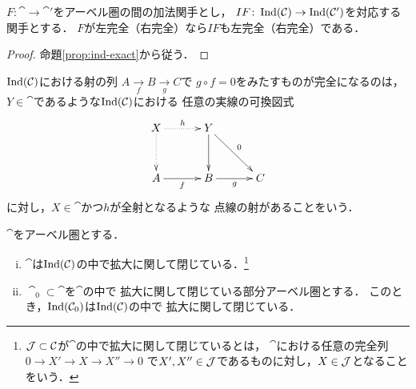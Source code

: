 \begin{comment}
\begin{Lemma}
    $I$を小さいフィルター圏，
    $\alpha\colon T\to \cat$を関手，
    $A=\limf\alpha$とし，
    $f\colon A\hookrightarrow B$を$\Ind(\cat)$における単射とする．
    このとき，小さいフィルター圏$K$と共終関手$p$
\end{Lemma}
\end{comment}

\begin{Corollary}
    $F\colon \cat\to\cat'$をアーベル圏の間の加法関手とし，
    $IF\colon\mathop{\mathrm{Ind}}(\mathcal{C})\to\mathop{\mathrm{Ind}}(\mathcal{C}')$を対応する関手とする．
    $F$が左完全（右完全）なら$IF$も左完全（右完全）である．
\end{Corollary}

\begin{proof}
    命題\ref{prop:ind-exact}から従う．
\end{proof}

\begin{Proposition}
    \(\mathop{\mathrm{Ind}}(\mathcal{C})\)における射の列
    \(A\underset{f}{\to}B\underset{g}{\to}C\)で
    \(g\circ{f}=0\)をみたすものが完全になるのは，
    \(Y\in\cat\)であるような\(\mathop{\mathrm{Ind}}(\mathcal{C})\)における
    任意の実線の可換図式
    \[\vcenter{\xymatrix@C=32pt@R=32pt{
        X
        \ar@{.>}[r]^-{h}
        \ar@{.>}[d]_-{}
        &Y
        \ar[d]^-{}
        \ar[rd]^-{0}
        \\
        A
        \ar[r]_-{f}
        &
        B
        \ar[r]_-{g}
        &
        C
    }}\]に対し，\(X\in\cat\)かつ\(h\)が全射となるような
    点線の射があることをいう．
\end{Proposition}

\begin{Proposition}
    \(\cat\)をアーベル圏とする．
    \begin{enumerate}[(i)]
        \item \(\cat\)は\(\mathop{\mathrm{Ind}}(\mathcal{C})\)の中で拡大に関して閉じている．\footnote{
            \(\mathcal{J}\subset\mathcal{C}\)が\(\cat\)の中で拡大に関して閉じているとは，
            \(\cat\)における任意の完全列
            \(0\to{X'}\to{X}\to{X''}\to0\)
            で\(X',X''\in\mathcal{J}\)であるものに対し，\(X\in\mathcal{J}\)となることをいう．
        }
        \item \(\cat_0\subset\cat\)を\(\cat\)の中で
        拡大に関して閉じている部分アーベル圏とする．
        このとき，\(\mathop{\mathrm{Ind}}(\mathcal{C}_0)\)は\(\mathop{\mathrm{Ind}}(\mathcal{C})\)の中で
        拡大に関して閉じている．
    \end{enumerate}
\end{Proposition}

